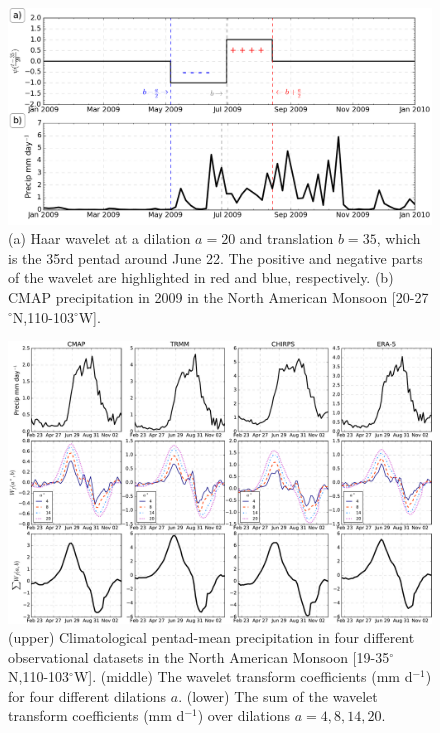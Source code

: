   \begin{figure}[t!]
\centering
 \includegraphics[width=\linewidth]{figures/wav1.png}
\caption[Haar wavelet exmaple]{ (a) Haar wavelet at a dilation $a=20$ and translation $b=35$, which is the 35rd pentad around June 22. The positive and negative parts of the wavelet are highlighted in red and blue, respectively. (b) CMAP precipitation in 2009 in the North American Monsoon [20-27$^\circ$N,110-103$^\circ$W]. }
\label{fig:wvt_f1}
\end{figure}


\begin{figure}[t!]
\centering
 \includegraphics[width=\linewidth]{figures/wav_fig2.pdf}
\caption[Wavelet transform coefficient in North American Monsoon]{ (upper) Climatological pentad-mean precipitation in four different observational datasets in the North American Monsoon [19-35$^\circ$N,110-103$^\circ$W]. (middle) The wavelet transform coefficients (mm d$^{-1}$) for four different dilations $a$. (lower) The sum of the wavelet transform coefficients (mm d$^{-1}$) over dilations $a={4,8,14,20}$. }
\label{fig:wvt_f2}
\end{figure}

